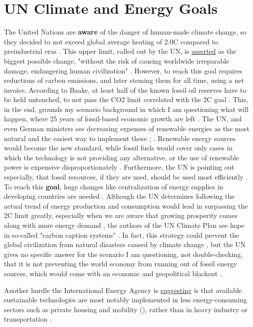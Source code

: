 \section{UN Climate and Energy Goals}
\label{sec:UN}
The United Nations are \textbf{aware} of the danger of human-made climate change, so they decided to not exceed global 
average heating of 2.0\degree C compared to preindustrial eras \cite{UN_Plan}. 
This upper limit, called out by the UN, is \underline{asserted} as the biggest possible change, "without the risk of causing worldwide irreparable damage, endangering human civilization" \cite{UN_Climate_Goals}.
However, to reach this goal requires reductions of carbon emissions, and later steming them for all time, using a net invoice.
According to Baake, at least half of the known fossil oil reserves have to be held untouched, to not
pass the CO2 limit correlated with the 2\degree C goal \cite{Industries}. 
This, in the end, grounds my scenario background in which I am questioning what will happen, 
where 25 years of fossil-based economic growth are left \cite{Bible}.
The UN, and even German ministers see decreasing expenses of renewable energies as the most natural and
the easiest way to implement these \cite{UN_Plan}; \cite{Industries}. 
Renewable energy sources would become the new standard, 
while fossil fuels would cover only cases in which the technology is not providing any alternative,
or the use of renewable power is expensive disproportionately \cite{Industries}.
{\Large Furthermore, the UN is pointing out especially, that} fossil resources, if they are used, 
should be used most efficiently \cite{UN_Plan}. 
To reach this \textbf{goal}, huge changes like centralization of energy supplies in developing countries are needed \cite{UN_Plan}.
{\Large Although the UN determines} following the actual trend of energy production and consumption would lead in surpassing the 2\degree C limit greatly,
especially when we are aware that growing prosperity comes along with more energy demand \cite{prosperity}, the authors of the UN Climate Plan see hope in so-called
"carbon caption systems" \cite{UN_Plan}. 
In fact, this strategy could prevent the global civilization from natural disasters caused by climate change \cite{UN_Climate_Goals}, 
but the UN gives no specific answer for the scenario I am questioning, not double-checking, that it is not preventing the world economy from running out of fossil 
energy sources, which would come with an economic and geopolitical blackout \cite{Bible}.
\par
Another hurdle the International Energy Agency is \underline{suggesting} is that available sustainable technologies are
most notably implemented in less energy-consuming sectors such as private housing and mobility (), 
rather than in heavy industry or transportation \cite{WEO_P_C}.


